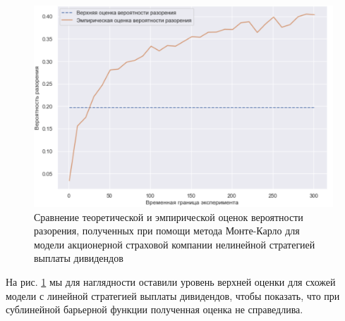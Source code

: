 \documentclass{article}
\theoremstyle{plain}
\theoremstyle{plain}
\theoremstyle{plain}
\theoremstyle{plain}
\theoremstyle{definition}
\theoremstyle{remark}
\begin{document}
\begin{figure}[h]
\centering
\includegraphics[scale=0.7]{images/non_linear_barrier_MC.png}
\captionsetup{justification=centering}
\caption{Сравнение теоретической и эмпирической оценок вероятности разорения, полученных при помощи метода Монте-Карло для модели акционерной страховой компании нелинейной стратегией выплаты дивидендов}
\label{nonlinear_MC}
\end{figure}

На рис. \ref{nonlinear_MC} мы для наглядности оставили уровень верхней оценки для схожей модели с линейной стратегией выплаты дивидендов, чтобы показать, что при сублинейной барьерной функции полученная оценка не справедлива.

\clearpage



\end{document}
